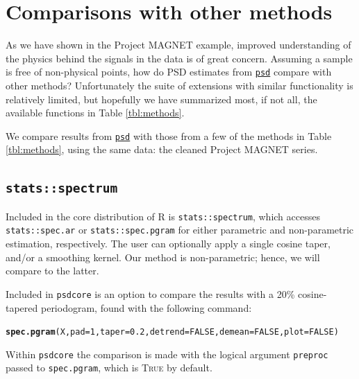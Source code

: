 \documentclass[10pt]{article}\usepackage[]{graphicx}\usepackage[]{color}
\makeatletter
\newcommand{\hlnum}[1]{\textcolor[rgb]{0.686,0.059,0.569}{#1}}%
\newcommand{\hlstd}[1]{\textcolor[rgb]{0.345,0.345,0.345}{#1}}%
\newcommand{\hlkwc}[1]{\textcolor[rgb]{0.333,0.667,0.333}{#1}}%
\newcommand{\hlkwd}[1]{\textcolor[rgb]{0.737,0.353,0.396}{\textbf{#1}}}%
\newenvironment{kframe}{%
 \def\at@end@of@kframe{}%
 \ifinner\ifhmode%
  \def\at@end@of@kframe{\end{minipage}}%
  \begin{minipage}{\columnwidth}%
 \fi\fi%
 \def\FrameCommand##1{\hskip\@totalleftmargin \hskip-\fboxsep
 \colorbox{shadecolor}{##1}\hskip-\fboxsep
     \hskip-\linewidth \hskip-\@totalleftmargin \hskip\columnwidth}%
 \MakeFramed {\advance\hsize-\width
   \@totalleftmargin\z@ \linewidth\hsize
   \@setminipage}}%
 {\par\unskip\endMakeFramed%
 \at@end@of@kframe}
\newenvironment{knitrout}{}{} %
\newcommand{\SC}[1]{\textsc{#1}}
\newcommand{\Rcmd}[1]{\texttt{#1}}
\newcommand{\psd}[0]{\href{http://www.github.com/abarbour/psd/}{\color{blue}\Rcmd{psd}}}
\makeatother
\begin{document}
\section{Comparisons with other methods}

As we have shown in the Project MAGNET example, 
improved understanding of the physics behind the signals in the data
is of great concern.
Assuming a sample is free of non-physical points, how do
PSD estimates from \psd{}
compare with other methods?
Unfortunately the suite of extensions with similar functionality
is relatively limited, but hopefully we have
summarized most, if not all, the available functions in Table \ref{tbl:methods}.



We compare results from
\psd{} with those from a few of the methods in Table \ref{tbl:methods},
using the same data: the cleaned Project MAGNET series.

\subsection{\Rcmd{stats::spectrum}}

Included in the core distribution of R is \Rcmd{stats::spectrum}, which
accesses \Rcmd{stats::spec.ar} or \Rcmd{stats::spec.pgram} for either
parametric and non-parametric estimation, respectively.  
The user can optionally apply a single cosine taper, and/or a smoothing kernel.
Our method is non-parametric; hence, we will compare to the latter.

Included in \Rcmd{psdcore} is an option to compare the 
results with a 20\% cosine-tapered periodogram,
found with the following command:
\begin{knitrout}\small
{}\color{fgcolor}\begin{kframe}
\begin{alltt}
\hlkwd{spec.pgram}\hlstd{(X,} \hlkwc{pad} \hlstd{=} \hlnum{1}\hlstd{,} \hlkwc{taper} \hlstd{=} \hlnum{0.2}\hlstd{,} \hlkwc{detrend} \hlstd{=} \hlnum{FALSE}\hlstd{,} \hlkwc{demean} \hlstd{=} \hlnum{FALSE}\hlstd{,} \hlkwc{plot} \hlstd{=} \hlnum{FALSE}\hlstd{)}
\end{alltt}
\end{kframe}
\end{knitrout}
Within \Rcmd{psdcore} the comparison is
made with
the logical argument \Rcmd{preproc} 
passed to \Rcmd{spec.pgram}, which is \SC{True} by default.
\end{document}
